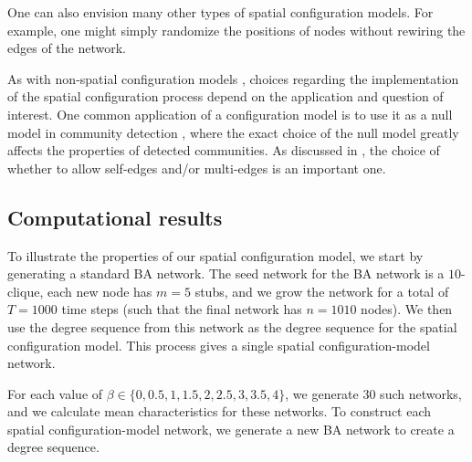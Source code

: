 \documentclass[%
 reprint,
 amsmath,amssymb,
 aps,
]{revtex4-1}
\begin{document}
One can also envision many other types of spatial configuration models. For example, one might simply randomize the positions of nodes without rewiring the edges of the network. 


As with non-spatial configuration models \cite{fosdick}, choices regarding the implementation of the spatial configuration process depend on the application and question of interest. One common application of a configuration model is to use it as a null model in community detection \cite{forcechains, community1, community2}, where the exact choice of the null model greatly affects the properties of detected communities. As discussed in \cite{fosdick}, the choice of whether to allow self-edges and/or multi-edges is an important one.



\subsection{Computational results}

To illustrate the properties of our spatial configuration model, we start by generating a standard BA network. The seed network for the BA network is a $10$-clique, each new node has $m=5$ stubs, and we grow the network for a total of $T=1000$ time steps (such that the final network has $n=1010$ nodes). We then use the degree sequence from this network as the degree sequence for the spatial configuration model. This process gives a single spatial configuration-model network.

For each value of $\beta \in \{0, 0.5, 1, 1.5, 2, 2.5, 3, 3.5, 4\}$, we generate $30$ such networks, and we calculate mean characteristics for these networks. To construct each spatial configuration-model network, we generate a new BA network to create a degree sequence.



\end{document}
